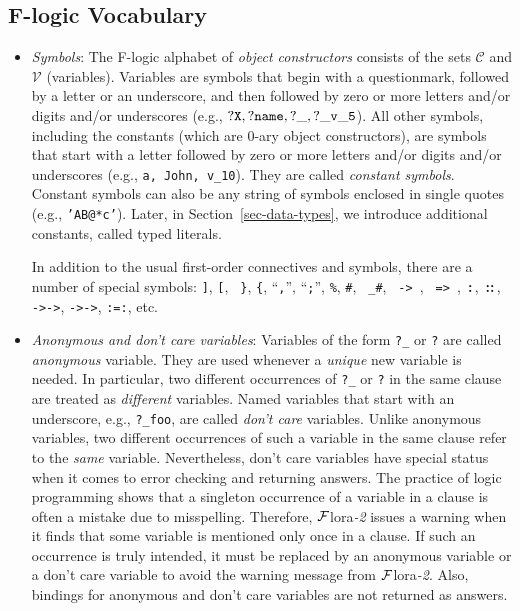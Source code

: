 \documentclass[11pt]{article}
\newcommand{\isa}{\,{\bf{:}}\,}
\newcommand{\subcl}{\,{\bf{::}}\,}
\newcommand{\mvd}{{\mbox{\tt \,->\,}}}  %
\newcommand{\Mvd}{{\mbox{\tt \,=>\,}}}  %
\newcommand{\FLORA}{{\mbox{\sc ${\cal F}${lora}\rm\emph{-2}}}\xspace}
\newcommand{\fl}{\mbox{F-logic}\xspace}
\newcommand{\consts}{\ensuremath{\mathcal{C}}\xspace}
\newcommand{\vars}{\ensuremath{\mathcal{V}}\xspace}
\begin{document}
\subsection{\fl Vocabulary}\label{sec-basic-flogic}


\begin{itemize}
\item \emph{Symbols}: The \fl alphabet of \emph{object constructors}
  consists of the sets \consts
  and \vars
  (variables).  Variables are symbols that begin with a questionmark,
  followed by a letter or an underscore, and then followed by zero or more letters and/or digits and/or
  underscores (e.g., $\tt ?X, ?name, ?\_, ?\_v\_5$).  All other symbols,
  including the constants (which are 0-ary object constructors), are
  symbols that start with a letter followed by zero or more letters and/or digits and/or
  underscores (e.g., {\tt a, John, v\_10}). They are called \emph{constant
  symbols}.  
  Constant symbols can also be any string of symbols enclosed in single quotes
  (e.g., {\tt 'AB@*c'}).
  Later, in Section~\ref{sec-data-types}, we introduce additional constants,
  called typed literals.
  
  In addition to the usual first-order connectives
  and symbols, there are a number of special symbols: {\tt ]}, {\tt [}, {\tt
    \}}, {\tt \{}, ``{\tt ,}'', ``{\tt ;}'', {\tt \%}, {\tt \#}, {\tt
    \_\#}, \mvd,
  \Mvd, \isa, \subcl, {\tt ->->}, {\tt *->->}, {\tt :=:}, etc.
  
\item \emph{Anonymous and don't care variables}: Variables  of the form
  {\tt ?\_} or {\tt ?} are called \emph{anonymous}
  variable. They are used whenever a \emph{unique} new variable is needed.  In
  particular, two different occurrences of {\tt ?\_} or {\tt ?} in the same clause are
  treated as \emph{different} variables. Named variables that start with an
  underscore, e.g., {\tt ?\_foo}, are called \emph{don't care} variables.
  Unlike anonymous variables, two different occurrences of such a variable
  in the same clause refer to the \emph{same} variable. Nevertheless, don't
  care variables have special status when it comes to error checking
  and returning answers.  The practice of logic programming shows that a
  singleton occurrence of a variable in a clause is often a mistake due to
  misspelling. Therefore, \FLORA issues a warning when it finds that some
  variable is mentioned only once in a clause. If such an occurrence is
  truly intended, it must be replaced by an anonymous variable or a don't
  care variable to avoid the warning message from \FLORA. Also, bindings
  for anonymous and don't care variables are not returned as answers.


\end{itemize}
\end{document}
